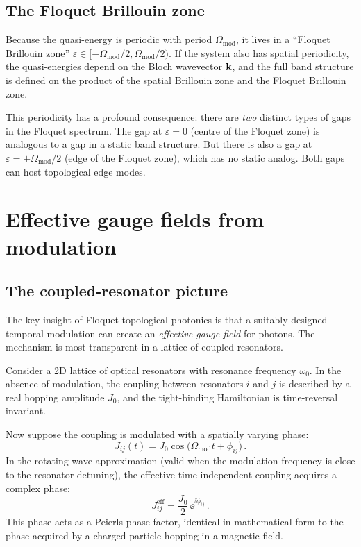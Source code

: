 \subsection{The Floquet Brillouin zone}
\label{sec:ch13-floquet-bz}

Because the quasi-energy is periodic with period $\Omega_{\mathrm{mod}}$,
it lives in a ``Floquet Brillouin zone''
$\varepsilon\in[-\Omega_{\mathrm{mod}}/2,\Omega_{\mathrm{mod}}/2)$.
If the system also has spatial periodicity, the quasi-energies depend on
the Bloch wavevector $\mathbf{k}$, and the full band structure is defined on
the product of the spatial Brillouin zone and the Floquet Brillouin zone.

This periodicity has a profound consequence: there are \emph{two}
distinct types of gaps in the Floquet spectrum.  The gap at
$\varepsilon=0$ (centre of the Floquet zone) is analogous to a gap in
a static band structure.  But there is also a gap at
$\varepsilon=\pm\Omega_{\mathrm{mod}}/2$ (edge of the Floquet zone),
which has no static analog.  Both gaps can host topological edge modes.

\section{Effective gauge fields from modulation}
\label{sec:ch13-gauge-fields}

\subsection{The coupled-resonator picture}
\label{sec:ch13-coupled-resonator}

The key insight of Floquet topological photonics is that a suitably
designed temporal modulation can create an \emph{effective gauge field}
for photons.  The mechanism is most transparent in a lattice of coupled
resonators.

Consider a 2D lattice of optical resonators with resonance frequency
$\omega_0$.  In the absence of modulation, the coupling between
resonators $i$ and $j$ is described by a real hopping amplitude
$J_0$, and the tight-binding Hamiltonian is time-reversal invariant.

Now suppose the coupling is modulated with a spatially varying phase:
\begin{equation}\label{eq:ch13-modulated-coupling}
  J_{ij}(t) = J_0\cos\bigl(\Omega_{\mathrm{mod}}t + \phi_{ij}\bigr)\,.
\end{equation}
In the rotating-wave approximation (valid when the modulation frequency
is close to the resonator detuning), the effective time-independent
coupling acquires a complex phase:
\begin{equation}\label{eq:ch13-effective-coupling}
  J_{ij}^{\mathrm{eff}} = \frac{J_0}{2}\,\ee^{\ii\phi_{ij}}\,.
\end{equation}
This phase acts as a Peierls phase factor, identical in mathematical
form to the phase acquired by a charged particle hopping in a magnetic
field.

